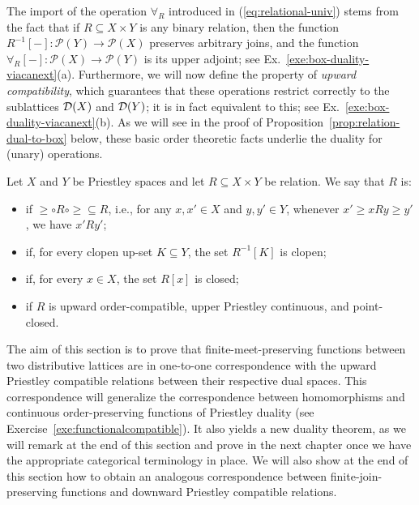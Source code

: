 The import of the operation $\forall_R$ introduced in (\ref{eq:relational-univ}) stems from the fact that if $R\subseteq X\times Y$ is any binary relation, then the function $R^{-1}[-] \colon \mathcal{P}(Y) \to \mathcal{P}(X)$ preserves arbitrary joins, and the function $\forall_R[-] \colon \mathcal{P}(X) \to \mathcal{P}(Y)$ is its upper adjoint; see Ex.~\ref{exe:box-duality-viacanext}(a). Furthermore, we will now define the property of \emph{upward compatibility}, which guarantees that these operations restrict correctly to the sublattices $\mathcal{D}(X)$ and $\mathcal{D}(Y)$; it is in fact equivalent to this; see Ex.~\ref{exe:box-duality-viacanext}(b). As we will see in the proof of Proposition~\ref{prop:relation-dual-to-box} below, these basic order theoretic facts underlie the duality for (unary) operations.


\begin{definition}\label{dfn:compatiblerelation}
Let $X$ and $Y$ be Priestley spaces and let $R \subseteq X \times Y$ be relation. We say that $R$ is: 
\begin{itemize}
	\item {} if ${\geq} \circ R \circ {\geq} \subseteq R$, i.e., for any $x, x' \in X$ and $y, y' \in Y$, whenever $x' \geq x {R} y \geq y'$, we have $x' {R} y'$;
	\item {} if, for every clopen up-set $K \subseteq Y$, the set $R^{-1}[K]$ is clopen; 
	\item {} if, for every $x \in X$, the set $R[x]$ is closed;
    \item {} if $R$ is upward order-compatible, upper Priestley continuous, and point-closed.
\end{itemize}
\end{definition}



The aim of this section is to prove that finite-meet-preserving functions between two distributive lattices are in one-to-one correspondence with the upward Priestley compatible relations between their respective dual spaces. This correspondence will generalize the correspondence between homomorphisms and continuous order-preserving functions of Priestley duality (see Exercise~\ref{exe:functionalcompatible}). It also yields a new duality theorem, as we will remark at the end of this section and prove in the next chapter once we have the appropriate categorical terminology in place. We will also show at the end of this section how to obtain an analogous correspondence between finite-join-preserving functions and downward Priestley compatible relations. 

